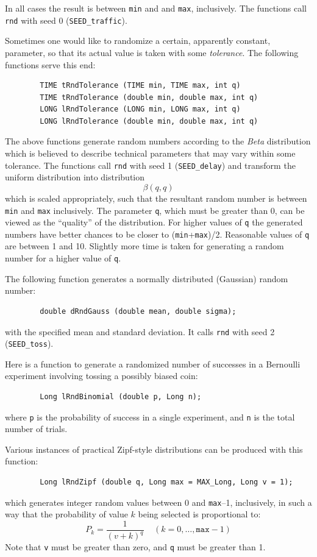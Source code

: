 In all cases the result is
between {\tt min} and and {\tt max}, inclusively.
The functions call {\tt rnd} with seed 0 ({\tt SEED\_traffic}).

Sometimes one would like to randomize a certain, apparently constant,
parameter, so that its actual value is taken with some {\em tolerance}.
The following functions serve this end:
\begin{verbatim}
        TIME tRndTolerance (TIME min, TIME max, int q)
        TIME tRndTolerance (double min, double max, int q)
        LONG lRndTolerance (LONG min, LONG max, int q)
        LONG lRndTolerance (double min, double max, int q)
\end{verbatim}

The above functions generate random numbers according to the {\em Beta\/}
distribution which is believed to describe technical parameters that may
vary within some tolerance.
The functions call {\tt rnd} with seed 1
({\tt SEED\_delay}) and transform the uniform distribution into distribution
\[
\beta (q, q)
\]
\noindent
which is scaled appropriately, such that the resultant random
number is between {\tt min} and {\tt max} inclusively.
The parameter {\tt q}, which must be greater than 0,
can be viewed as the ``quality'' of the distribution.
For higher values of
{\tt q} the generated numbers have better chances to be closer to
({\tt min}+{\tt max})/2.
Reasonable values of {\tt q} are between 1 and 10.
Slightly more time is taken for generating a random number for a higher
value of {\tt q}.

The following function generates a normally distributed (Gaussian) random
number:
\begin{verbatim}
        double dRndGauss (double mean, double sigma);
\end{verbatim}
with the specified mean and standard deviation.
It calls {\tt rnd} with seed 2 ({\tt SEED\_toss}).

Here is a function to generate a randomized number of successes in a
Bernoulli experiment involving tossing a possibly biased coin:
\begin{verbatim}
        Long lRndBinomial (double p, Long n);
\end{verbatim}
\noindent
where {\tt p} is the probability of success in a single experiment, and {\tt n}
is the total number of trials.

Various instances of practical Zipf-style distributions can be produced with
this function:
\begin{verbatim}
        Long lRndZipf (double q, Long max = MAX_Long, Long v = 1);
\end{verbatim}
which generates integer random values between 0 and {\tt max}--1, inclusively,
in such a way that the probability of value $k$ being selected is proportional
to:
\[
P_k = \frac{1}{(v + k)^q}\;\;\;\;(k = 0, \ldots, \texttt{max}-1)
\]
Note that {\tt v} must be greater than zero, and {\tt q} must be greater
than 1.

